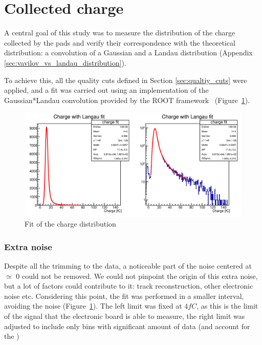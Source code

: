 \section{Collected charge}\label{sec:methods_collected_charge}

A central goal of this study was to measure the distribution of the charge collected by the pads and verify their correspondence with the theoretical distribution: a convolution of a Gaussian and a Landau distribution (Appendix \ref{sec:vavilov_vs_landau_distribution}).

To achieve this, all the quality cuts defined in Section \ref{sec:qualtiy_cuts} were applied, and a fit was carried out using an implementation of the Gaussian*Landau convolution provided by the ROOT framework~\cite{Brun:1997pa} (Figure~\ref{fig:charge_ROOT_fit}). 

\begin{figure}[!ht]
    \centering
    \includegraphics[width=1\linewidth]{Images/charge_plots/charge_data_all_cuts_401_S1_3_Charge_fit_ROOT_double_plot.png}
    \captionsetup{width=\captionwidth}
    \caption{Fit of the charge distribution}
    \label{fig:charge_ROOT_fit}
\end{figure}


\subsubsection{Extra noise}
Despite all the trimming to the data, a noticeable part of the noise centered at $\simeq$ 0 could not be removed. We could not pinpoint the origin of this extra noise, but a lot of factors could contribute to it: track reconstruction, other electronic noise etc.
Considering this point, the fit was performed in a smaller interval, avoiding the noise (Figure~\ref{fig:charge_ROOT_fit}). The left limit was fixed at $4\si{fC}$, as this is the limit of the signal that the electronic board is able to measure, the right limit was adjusted to include only bins with significant amount of data (and account for the )

